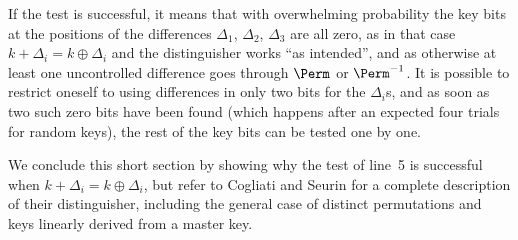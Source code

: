 If the test is successful, it means that with overwhelming probability
the key bits at the positions of the differences $\Delta_1$, $\Delta_2$,
$\Delta_3$ are all zero, as in that case  $k + \Delta_i = k \oplus \Delta_i$ and
the distinguisher works ``as intended'', and as otherwise at least one uncontrolled difference goes through $\Perm$ or $\Perm^{-1}$.
It is possible to restrict oneself to using differences in only two bits for the $\Delta_i$s, and as soon as two such zero bits
have been found (which happens after an expected four trials for
random keys), the rest of the key bits can be tested one by one.

We conclude this short section by showing why the test of line~5 is successful when $k + \Delta_i = k \oplus \Delta_i$,
but refer to Cogliati and Seurin for a complete description of their distinguisher, including the general case of distinct
permutations and keys linearly derived from a master key.

